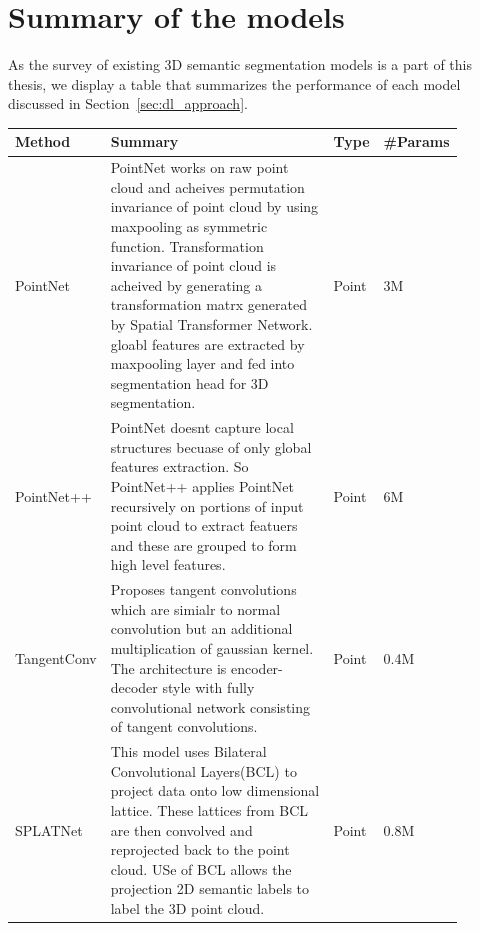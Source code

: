     \section{Summary of the models}
    As the survey of existing 3D semantic segmentation models is a part of this thesis, we display a table that summarizes the performance of each model discussed in Section~\ref{sec:dl_approach}.
    \begin{longtable}{|p{0.15\linewidth} | p{0.59\linewidth}| p{0.06\linewidth} |p{0.09\linewidth}|}
            \hline
            \textbf{Method} & \textbf{Summary} & \textbf{Type} & \textbf{\#Params} \\
            \hline 
            PointNet\cite{Qi_2017_CVPR_pointnet} &
            PointNet works on raw point cloud and acheives permutation invariance of point cloud by using maxpooling as symmetric function.
            Transformation invariance of point cloud is acheived by generating a transformation matrx generated by Spatial Transformer Network.
            gloabl features are extracted by maxpooling layer and fed into segmentation head for 3D segmentation.
            & Point & 3M \\
            \hline
            PointNet++\cite{qi2017pointnet++} &
            PointNet doesnt capture local structures becuase of only global features extraction.
            So PointNet++ applies PointNet recursively on portions of input point cloud to extract featuers and these are grouped to form high level features.
            & Point & 6M \\
            \hline
            TangentConv\cite{Tatarchenko_2018_CVPR_tangconv} &
            Proposes tangent convolutions which are simialr to normal convolution but an additional multiplication of gaussian kernel.
            The architecture is encoder-decoder style with fully convolutional network consisting of tangent convolutions.
            & Point & 0.4M\\
            \hline
            SPLATNet\cite{Su_2018_CVPR_splatnet} &
            This model uses Bilateral Convolutional Layers(BCL) to project data onto low dimensional lattice.
            These lattices from BCL are then convolved and reprojected back to the point cloud.
            USe of BCL allows the projection 2D semantic labels to label the 3D point cloud.
            & Point & 0.8M \\

\end{longtable}
